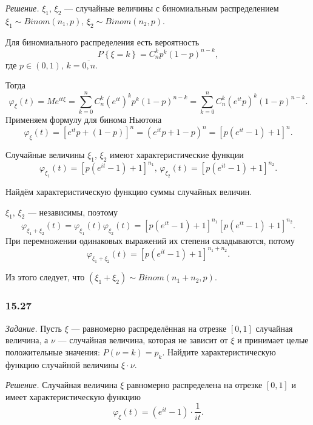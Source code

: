 \textit{Решение.}
$ \xi_1, \, \xi_2$ ---
случайные величины с биномиальным распределением
$ \xi_1 \sim Binom \left( n_1, p \right), \,
  \xi_2 \sim Binom \left( n_2, p \right) $.

Для биномиального распределения есть вероятность
$$P \left\{ \xi = k \right\} =
  C_n^k p^k \left( 1 - p \right)^{n - k},$$
где $p \in \left( 0, 1 \right), \, k = \overline{0, n}$.

Тогда
$$ \varphi_{ \xi } \left( t \right) =
  Me^{it \xi } =
  \sum \limits_{k = 0}^{n} C_n^k \left( e^{it} \right)^k p^k \left( 1 - p \right)^{n - k} =
  \sum \limits_{k = 0}^{n} C_n^k \left( e^{it} p \right)^k \left( 1 - p \right)^{n - k}.$$
Применяем формулу для бинома Ньютона
$$ \varphi_{ \xi } \left( t \right) =
  \left[ e^{it} p + \left( 1 - p \right) \right]^n =
  \left( e^{it} p + 1 - p \right)^n =
  \left[ p \left( e^{it} - 1 \right) + 1 \right]^n.$$

Случайные величины $ \xi_1, \, \xi_2$ имеют характеристические функции
$$ \varphi_{ \xi_1 } \left( t \right) = \left[ p \left( e^{it} - 1 \right) + 1 \right]^{n_1}, \,
  \varphi_{ \xi_2 } \left( t \right) = \left[ p \left( e^{it} - 1 \right) + 1 \right]^{n_2}.$$

Найдём характеристическую функцию суммы случайных величин.

$ \xi_1, \, \xi_2$ --- независимы,
поэтому
$$ \varphi_{ \xi_1 + \xi_2} \left( t \right) =
  \varphi_{ \xi_1} \left( t \right) \varphi_{ \xi_2} \left( t \right) =
  \left[ p \left( e^{it} - 1 \right) + 1 \right]^{n_1}
  \left[ p \left( e^{it} - 1 \right) + 1 \right]^{n_2}.$$
При перемножении одинаковых выражений их степени складываются, потому
$$ \varphi_{ \xi_1 + \xi_2} \left( t \right) =
  \left[ p \left( e^{it} - 1 \right) + 1 \right]^{n_1 + n_2}.$$

Из этого следует, что $ \left( \xi_1 + \xi_2 \right) \sim Binom \left( n_1 + n_2, p \right) $.

\subsubsection*{15.27}

\textit{Задание.}
Пусть $ \xi $ --- равномерно распределённая на отрезке $ \left[ 0, 1 \right] $ случайная величина,
а $ \nu $ --- случайная величина,
которая не зависит от $ \xi $ и принимает целые положительные значения:
$P \left( \nu = k \right) =
  p_k$.
Найдите характеристическую функцию случайной величины $ \xi \cdot \nu $.

\textit{Решение.}
Случайная величина $ \xi $ равномерно распределена на отрезке $ \left[ 0, 1 \right] $
и имеет характеристическую функцию
$$ \varphi_{ \xi } \left( t \right) =
  \left( e^{it} - 1 \right) \cdot \frac{1}{it}.$$

